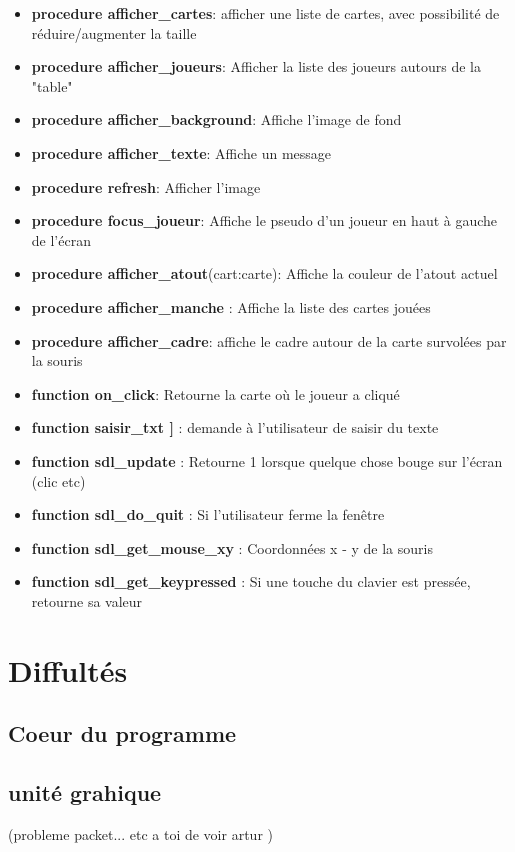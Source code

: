 \documentclass[12pt]{report}
\begin{document}
\begin{itemize}
\item \textbf{procedure afficher\_cartes}: afficher une liste de cartes, avec possibilité de réduire/augmenter la taille
\item \textbf{procedure afficher\_joueurs}: Afficher la liste des joueurs autours de la "table"
\item \textbf{procedure afficher\_background}: Affiche l'image de fond
\item \textbf{procedure afficher\_texte}: Affiche un message
\item \textbf{procedure refresh}: Afficher l'image
\item \textbf{procedure focus\_joueur}: Affiche le pseudo d'un joueur en haut à gauche de l'écran
\item \textbf{procedure afficher\_atout}(cart:carte): Affiche la couleur de l'atout actuel
\item \textbf{procedure afficher\_manche} : Affiche la liste des cartes jouées
\item \textbf{procedure afficher\_cadre}: affiche le cadre autour de la carte survolées par la souris 
\item \textbf{function on\_click}: Retourne la carte où le joueur a cliqué
\item  \textbf{function saisir\_txt ]} :  demande à l'utilisateur de saisir du texte
\item \textbf{function sdl\_update } : Retourne 1 lorsque quelque chose bouge sur l'écran (clic etc)
\item \textbf{function sdl\_do\_quit} : Si l'utilisateur ferme la fenêtre
\item \textbf{function sdl\_get\_mouse\_xy} : Coordonnées x - y de la souris
\item \textbf{function sdl\_get\_keypressed} : Si une touche du clavier est pressée, retourne sa valeur
	\end{itemize}

\section{Diffultés }
	\subsection{Coeur du programme}
	
	\subsection{unité grahique}
(probleme packet... etc a toi de voir artur )
\end{document}
